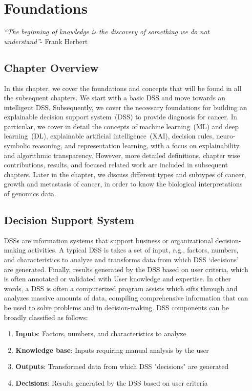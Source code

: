 \chapter{Foundations}
\label{chapter:preli}
\textit{``The beginning of knowledge is the discovery of something we do not understand''}- Frank Herbert 

\section{Chapter Overview}
In this chapter, we cover the foundations and concepts that will be found in all the subsequent chapters. We start with a basic DSS and move towards an intelligent DSS. Subsequently, we cover the necessary foundations for building an explainable decision support system~(DSS) to provide diagnosis for cancer. In particular, we cover in detail the concepts of machine learning~(ML) and deep learning~(DL), explainable artificial intelligence~(XAI), decision rules, neuro-symbolic reasoning, and representation learning, with a focus on explainability and algorithmic transparency. However, more detailed definitions, chapter wise contributions, results, and focused related work are included in subsequent chapters. Later in the chapter, we discuss different types and subtypes of cancer, growth and metastasis of cancer, in order to know the biological interpretations of genomics data. 

\section{Decision Support System}\label{sec:DSS}
DSSs are information systems that support business or organizational decision-making activities. A typical DSS is takes a set of input, e.g., factors, numbers, and characteristics to analyze and transforms data from which DSS `decisions' are generated. Finally, results generated by the DSS based on user criteria, which is often annotated or validated with User knowledge and expertise. In other words, a DSS is  often a computerized program assists which sifts through and analyzes massive amounts of data, compiling comprehensive information that can be used to solve problems and in decision-making. DSS components can be broadly classified as follows: 

\begin{enumerate}[noitemsep]
    \item  \textbf{Inputs}: Factors, numbers, and characteristics to analyze
    \item \textbf{Knowledge base}: Inputs requiring manual analysis by the user
    \item \textbf{Outputs}: Transformed data from which DSS "decisions" are generated
    \item \textbf{Decisions}: Results generated by the DSS based on user criteria
\end{enumerate}

